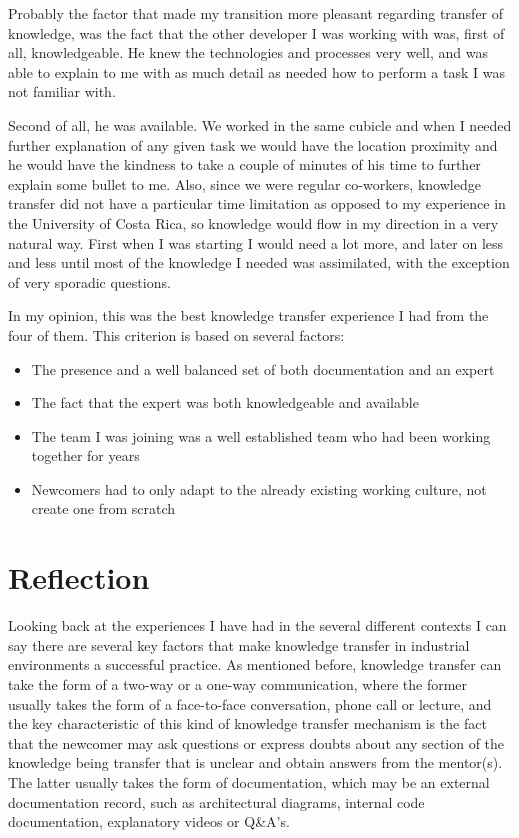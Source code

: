 \documentclass[12pt, letterpaper]{article}
\begin{document}
Probably the factor that made my transition more pleasant regarding transfer of knowledge, was the fact that 
the other developer I was working with was, first of all, knowledgeable. He knew the technologies and processes
very well, and was able to explain to me with as much detail as needed how to perform a task I was not familiar with. 

Second of all, he was available. We worked in the same cubicle and when I needed further explanation of any given 
task we would have the location proximity and he would have the kindness to take a couple of minutes of his time
to further explain some bullet to me. Also, since we were regular co-workers, knowledge transfer did not have a particular
time limitation as opposed to my experience in the University of Costa Rica, so knowledge would flow in my
direction in a very natural way. First when I was starting I would need a lot more, and later on less and less 
until most of the knowledge I needed was assimilated, with the exception of very sporadic questions. 

In my opinion, this was the best knowledge transfer experience I had from the four of them. This criterion is based on
several factors:
\begin{itemize}
  \item The presence and a well balanced set of both documentation and an expert
  \item The fact that the expert was both knowledgeable and available
  \item The team I was joining was a well established team who had been working together for years
  \item Newcomers had to only adapt to the already existing working culture, not create one from scratch
\end{itemize}

\section{Reflection}

Looking back at the experiences I have had in the several different contexts I can say there are several
key factors that make knowledge transfer in industrial environments a successful practice. As mentioned
before, knowledge transfer can take the form of a two-way or a one-way communication, where the former
usually takes the form of a face-to-face conversation, phone call or lecture, and the key characteristic
of this kind of knowledge transfer mechanism is the fact that the newcomer may ask questions or express
doubts about any section of the knowledge being transfer that is unclear and obtain
answers from the mentor(s). The latter usually takes the form of documentation, which may be an external 
documentation record, such as architectural diagrams, internal code documentation, explanatory videos or Q\&A's.
\end{document}
